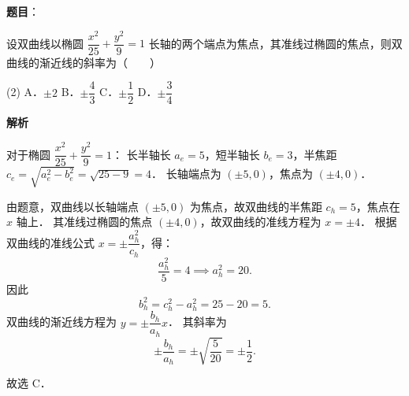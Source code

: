 \begin{answer}

\textbf{题目}：

设双曲线以椭圆 $\dfrac{x^2}{25} + \dfrac{y^2}{9} = 1$ 长轴的两个端点为焦点，其准线过椭圆的焦点，则双曲线的渐近线的斜率为\mbox{（　　）}

\begin{gkopts}(2)
\task A．$\pm 2$
\task B．$\pm \dfrac{4}{3}$
\task C．$\pm \dfrac{1}{2}$
\task D．$\pm \dfrac{3}{4}$
\end{gkopts}

\textbf{解析}

对于椭圆 $\dfrac{x^2}{25} + \dfrac{y^2}{9} = 1$：
长半轴长 $a_e = 5$，短半轴长 $b_e = 3$，半焦距 $c_e = \sqrt{a_e^2 - b_e^2} = \sqrt{25 - 9} = 4$．
长轴端点为 $(\pm 5, 0)$，焦点为 $(\pm 4, 0)$．

由题意，双曲线以长轴端点 $(\pm 5, 0)$ 为焦点，故双曲线的半焦距 $c_h = 5$，焦点在 $x$ 轴上．
其准线过椭圆的焦点 $(\pm 4, 0)$，故双曲线的准线方程为 $x = \pm 4$．
根据双曲线的准线公式 $x = \pm \dfrac{a_h^2}{c_h}$，得：
\nopagebreak[4]
\[
\dfrac{a_h^2}{5} = 4 \implies a_h^2 = 20.
\]
因此
\nopagebreak[4]
\[
b_h^2 = c_h^2 - a_h^2 = 25 - 20 = 5.
\]
双曲线的渐近线方程为 $y = \pm \dfrac{b_h}{a_h} x$．
其斜率为
\nopagebreak[4]
\[
\pm \dfrac{b_h}{a_h} = \pm \sqrt{\dfrac{5}{20}} = \pm \dfrac{1}{2}.
\]

故选 C．


\end{answer}
